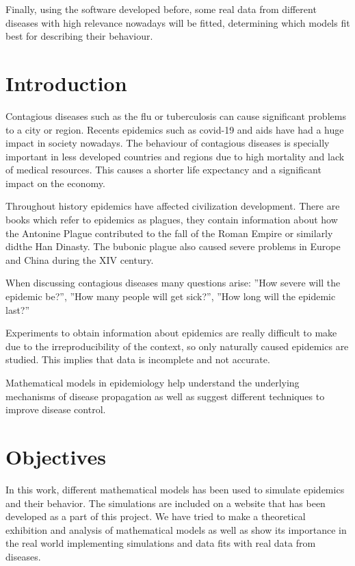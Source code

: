 Finally, using the software developed before, some real data from different diseases with high relevance nowadays will be fitted, determining which models fit best for describing their behaviour.

\section*{Introduction}

Contagious diseases such as the flu or tuberculosis can cause significant problems to a city or region. Recents epidemics such as covid-19 and aids have had a huge impact in society nowadays. The behaviour of contagious diseases is specially important in less developed countries and regions due to high mortality and lack of medical resources. This causes a shorter life expectancy and a significant impact on the economy.

Throughout history epidemics have affected civilization development. There are books which refer to epidemics as plagues, they contain information about how the Antonine Plague contributed to the fall of the Roman Empire or similarly didthe Han Dinasty. The bubonic plague also caused severe problems in Europe and China during the XIV century.

When discussing contagious diseases many questions arise: ''How severe will the epidemic be?'', ''How many people will get sick?'', ''How long will the epidemic last?''

Experiments to obtain information about epidemics are really difficult to make due to the irreproducibility of the context, so only naturally caused epidemics are studied. This implies that data is incomplete and not accurate.

Mathematical models in epidemiology help understand the underlying mechanisms of disease propagation as well as suggest different techniques to improve disease control.

\section*{Objectives}

In this work, different mathematical models has been used to simulate epidemics and their behavior. The simulations are included on a website that has been developed as a part of this project. We have tried to make a theoretical exhibition and analysis of mathematical models as well as show its importance in the real world implementing simulations and data fits with real data from diseases.

